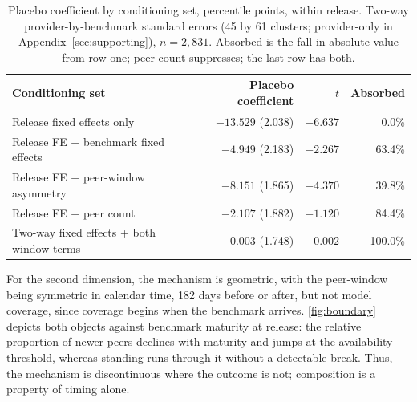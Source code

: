 \documentclass{article}
\begin{document}
\begin{table}[!htb]
\centering
\small
\begin{tabular}{lrrr}
\toprule
Conditioning set & Placebo coefficient & $t$ & Absorbed \\
\midrule
Release fixed effects only & $-13.529$ (2.038) & $-6.637$ & 0.0\% \\
Release FE + benchmark fixed effects & $-4.949$ (2.183) & $-2.267$ & 63.4\% \\
Release FE + peer-window asymmetry & $-8.151$ (1.865) & $-4.370$ & 39.8\% \\
Release FE + peer count & $-2.107$ (1.882) & $-1.120$ & 84.4\% \\
Two-way fixed effects + both window terms & $-0.003$ (1.748) & $-0.002$ & 100.0\% \\
\bottomrule
\end{tabular}
\caption{%
Placebo coefficient by conditioning set, percentile points, within release. Two-way provider-by-benchmark standard errors (45 by 61 clusters; provider-only in Appendix~\ref{sec:supporting}), $n = 2{,}831$. Absorbed is the fall in absolute value from row one; peer count suppresses; the last row has both.}
\label{tab:decomposition}
\end{table}


For the second dimension, the mechanism is geometric, with the peer-window being symmetric in calendar time, 182 days before or after, but not model coverage, since coverage begins when the benchmark arrives. \autoref{fig:boundary} depicts both objects against benchmark maturity at release: the relative proportion of newer peers declines with maturity and jumps at the availability threshold, whereas standing runs through it without a detectable break. Thus, the mechanism is discontinuous where the outcome is not; composition is a property of timing alone.
\end{document}
